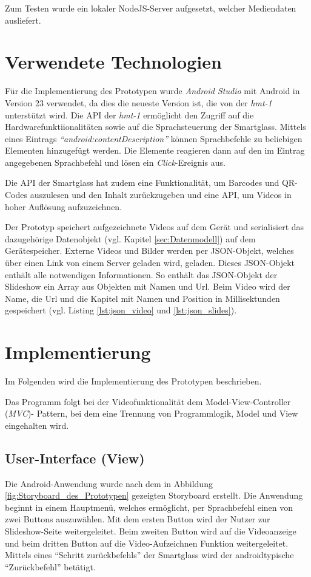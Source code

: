 Zum Testen wurde ein lokaler NodeJS-Server aufgesetzt, welcher Mediendaten ausliefert.
%
%
%
%
%
%
\section{Verwendete Technologien}
\label{sec:Verwendete_Technologien}
Für die Implementierung des Prototypen wurde \emph{Android Studio} mit Android in Version 23 verwendet, da dies die neueste Version ist, die von der \emph{hmt-1} unterstützt wird. Die API der \emph{hmt-1} ermöglicht den Zugriff auf die Hardwarefunktiionalitäten sowie auf die Sprachsteuerung der Smartglass. Mittels eines Eintrags \emph{\enquote{android:contentDescription}} können Sprachbefehle zu beliebigen Elementen hinzugefügt werden. Die Elemente reagieren dann auf den im Eintrag angegebenen Sprachbefehl und lösen ein \emph{Click}-Ereignis aus.

Die API der Smartglass hat zudem eine Funktionalität, um Barcodes und QR-Codes auszulesen und den Inhalt zurückzugeben und eine API, um Videos in hoher Auflösung aufzuzeichnen. 

Der Prototyp speichert aufgezeichnete Videos auf dem Gerät und serialisiert das dazugehörige Datenobjekt (vgl. Kapitel \ref{sec:Datenmodell}) auf dem Gerätespeicher. Externe Videos und Bilder werden per JSON-Objekt, welches über einen Link von einem Server geladen wird, geladen. Dieses JSON-Objekt enthält alle notwendigen Informationen. So enthält das JSON-Objekt der Slideshow ein Array aus Objekten mit Namen und Url. Beim Video wird der Name, die Url und die Kapitel mit Namen und Position in Millisektunden gespeichert (vgl. Listing \ref{lst:json_video} und \ref{lst:json_slides}).
%
%
%
%
%
%
\section{Implementierung}
\label{sec:Implementation}
Im Folgenden wird die Implementierung des Prototypen beschrieben. 

Das Programm folgt bei der Videofunktionalität dem Model-View-Controller (\emph{MVC})- Pattern, bei dem eine Trennung von Programmlogik, Model und View eingehalten wird.
%
%
%
%
%
%
\subsection{User-Interface (View)}
Die Android-Anwendung wurde nach dem in Abbildung \ref{fig:Storyboard_des_Prototypen} gezeigten Storyboard erstellt. Die Anwendung beginnt in einem Hauptmenü, welches ermöglicht, per Sprachbefehl einen von zwei Buttons auszuwählen. Mit dem ersten Button wird der Nutzer zur Slideshow-Seite weitergeleitet. Beim zweiten Button wird auf die Videoanzeige und beim dritten Button auf die Video-Aufzeichnen Funktion weitergeleitet. Mittels eines \enquote{Schritt zurückbefehls} der Smartglass wird der androidtypische \enquote{Zurückbefehl} betätigt.

